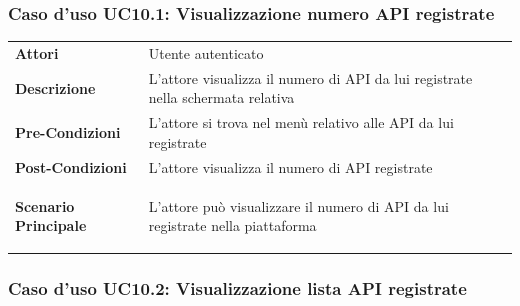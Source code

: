 \subsubsection{Caso d'uso UC10.1: Visualizzazione numero API registrate}
\label{UC10_1}

\begin{minipage}{\linewidth}
	\begin{tabular}{ l | p{11cm}}
		\hline
		\rowcolor{Gray}
		\multicolumn{2}{c}{UC10.1 - Visualizzazione numero API registrate} \\
		\hline
		\textbf{Attori} & Utente autenticato \\
		\textbf{Descrizione} & L'attore visualizza il numero di API da lui registrate nella schermata relativa\\
		\textbf{Pre-Condizioni} & L'attore si trova nel menù relativo alle API da lui registrate\\
		\textbf{Post-Condizioni} & L'attore visualizza il numero di API registrate \\
		\textbf{Scenario Principale} & 
		\begin{enumerate*}[label=(\arabic*.),itemjoin={\newline}]
			\item L'attore può visualizzare il numero di API da lui registrate nella piattaforma
		\end{enumerate*}\\
	\end{tabular}
\end{minipage}

\subsubsection{Caso d'uso UC10.2: Visualizzazione lista API registrate}
\label{UC10_2}

